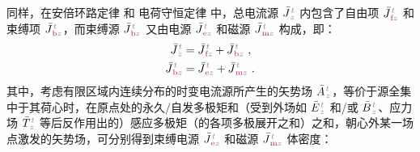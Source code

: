 同样，在安倍环路定律  和 电荷守恒定律  中，总电流源 $\bar{J}^{\;\!\mathcolor{gray}{t}}_{\;\!\mathcolor{gray}{z}}$ 内包含了自由项 $\bar{J}^{\;\!\mathcolor{gray}{t}}_{\;\!\textcolor{Maroon}{\text{f}}\mathcolor{gray}{z}}$ 和束缚项 $\bar{J}^{\;\!\mathcolor{gray}{t}}_{\;\!\textcolor{Maroon}{\text{b}}\mathcolor{gray}{z}}$\cite{langeMultipoleTheoryHehl2015,raabMultipoleTheoryElectromagnetism2004}，而束缚源 $\bar{J}^{\;\!\mathcolor{gray}{t}}_{\;\!\textcolor{Maroon}{\text{b}}\mathcolor{gray}{z}}$ 又由电源 $\bar{J}^{\;\!\mathcolor{gray}{t}}_{\;\!\textcolor{Maroon}{\text{e}}\mathcolor{gray}{z}}$ 和磁源 $\bar{J}^{\;\!\mathcolor{gray}{t}}_{\;\!\textcolor{Maroon}{\text{m}}\mathcolor{gray}{z}}$ 构成，即：
\begin{subequations} \label{eq:j-fbem}
	\abovedisplayskip=-2pt
	\belowdisplayskip=10pt
\begin{align}
	\bar{J}^{\;\!\mathcolor{gray}{t}}_{\;\!\mathcolor{gray}{z}} &= \bar{J}^{\;\!\mathcolor{gray}{t}}_{\;\!\textcolor{Maroon}{\text{f}}\mathcolor{gray}{z}} + \bar{J}^{\;\!\mathcolor{gray}{t}}_{\;\!\textcolor{Maroon}{\text{b}}\mathcolor{gray}{z}}~, \label{eq:j=f+b} \\ \bar{J}^{\;\!\mathcolor{gray}{t}}_{\;\!\textcolor{Maroon}{\text{b}}\mathcolor{gray}{z}} &= \bar{J}^{\;\!\mathcolor{gray}{t}}_{\;\!\textcolor{Maroon}{\text{e}}\mathcolor{gray}{z}} + \bar{J}^{\;\!\mathcolor{gray}{t}}_{\;\!\textcolor{Maroon}{\text{m}}\mathcolor{gray}{z}}~. \label{eq:b=e+m}
\end{align}
\end{subequations}
其中，考虑有限区域内连续分布的时变电流源所产生的矢势场 $\bar{A}^{\;\!\mathcolor{gray}{t}}_{\;\!\mathcolor{gray}{z}}$，等价于源全集中于其荷心时，在原点处的永久/自发多极矩和（受到外场如 $\bar{E}^{\;\!\mathcolor{gray}{t}}_{\;\!\mathcolor{gray}{z}}$ 和/或 $\bar{B}^{\;\!\mathcolor{gray}{t}}_{\;\!\mathcolor{gray}{z}}$、应力场 $\bar{T}^{\;\!\mathcolor{gray}{t}}_{\;\!\mathcolor{gray}{z}}$ 等后反作用出的）感应多极矩（的各项多极展开之和）之和，朝心外某一场点激发的矢势场\cite{raabMultipoleTheoryElectromagnetism2004,delangeTranslationalInvariancePost2012,chen-zhuChenZhuxieUndergraduate_courses2024}，可分别得到束缚电源 $\bar{J}^{\;\!\mathcolor{gray}{t}}_{\;\!\textcolor{Maroon}{\text{e}}\mathcolor{gray}{z}}$ 和磁源 $\bar{J}^{\;\!\mathcolor{gray}{t}}_{\;\!\textcolor{Maroon}{\text{m}}\mathcolor{gray}{z}}$ 体密度：
